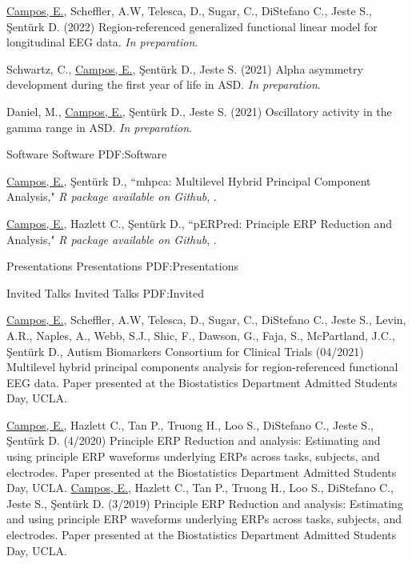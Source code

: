 \documentclass[letterpaper,MMMyyyy,nonstopmode]{simpleresumecv}
\begin{document}
\begin{Body}
\begingroup
\renewcommand{\MaxNumberedItem}{[88]}

\BigGap
\BulletItem
\underline{Campos, E.}, Scheffler, A.W, Telesca, D., Sugar, C., DiStefano C., Jeste S., \c{S}ent\"{u}rk D. (2022) Region-referenced generalized functional linear model for longitudinal EEG data. \textit{In preparation}.

\BigGap
\BulletItem 
Schwartz, C., \underline{Campos, E.}, \c{S}ent\"{u}rk D., Jeste S. (2021) Alpha asymmetry development during the first year of life in ASD. \textit{In preparation}.

\BigGap
\BulletItem 
Daniel, M., \underline{Campos, E.}, \c{S}ent\"{u}rk D., Jeste S. (2021) Oscillatory activity in the gamma range in ASD. \textit{In preparation}.

\endgroup

\BigGap
\SubSection
{Software}
{Software}
{PDF:Software}

\begingroup
\renewcommand{\MaxNumberedItem}{[8888]}

\BigGap
\BulletItem
\underline{Campos, E.}, \c{S}ent\"{u}rk D., ``mhpca: Multilevel Hybrid Principal Component Analysis," \textit{R package available on Github}, .

\BigGap
\BulletItem
\underline{Campos, E.}, Hazlett C., \c{S}ent\"{u}rk D., ``pERPred:  Principle ERP Reduction and Analysis," \textit{R package available on Github}, .


\endgroup


\Section
{Presentations}
{Presentations}
{PDF:Presentations}

\SubSection
{Invited Talks}
{Invited Talks}
{PDF:Invited}

\BigGap 
\BulletItem 
\underline{Campos, E.}, Scheffler, A.W, Telesca, D., Sugar, C., DiStefano C., Jeste S., Levin, A.R., Naples, A., Webb, S.J., Shic, F., Dawson, G., Faja, S., McPartland, J.C., \c{S}ent\"{u}rk D., Autism Biomarkers Consortium for Clinical Trials (04/2021) Multilevel hybrid principal components analysis for region-referenced functional EEG data. Paper presented at the Biostatistics Department Admitted Students Day, UCLA.

\BigGap
\BulletItem 
\underline{Campos, E.}, Hazlett C., Tan P., Truong H., Loo S., DiStefano C., Jeste S., \c{S}ent\"{u}rk D. (4/2020) Principle ERP Reduction and analysis: Estimating and using principle ERP waveforms underlying ERPs across tasks, subjects, and electrodes. Paper presented at the Biostatistics Department Admitted Students Day, UCLA.
\BigGap
\BulletItem
\underline{Campos, E.}, Hazlett C., Tan P., Truong H., Loo S., DiStefano C., Jeste S., \c{S}ent\"{u}rk D. (3/2019) Principle ERP Reduction and analysis: Estimating and using principle ERP waveforms underlying ERPs across tasks, subjects, and electrodes. Paper presented at the Biostatistics Department Admitted Students Day, UCLA.


\end{Body}
\end{document}

